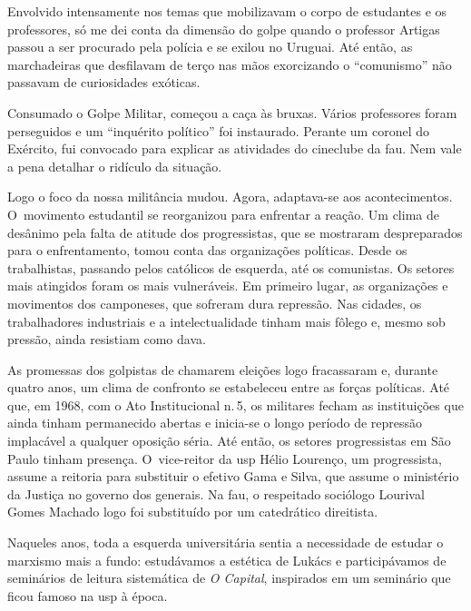 {Envolvido intensamente nos temas que mobilizavam o corpo de estudantes e
os professores, só me dei conta da dimensão do golpe quando o professor
Artigas passou a ser procurado pela polícia e se exilou no Uruguai. Até
então, as marchadeiras que desfilavam de terço nas mãos exorcizando o
“comunismo” não passavam de curiosidades exóticas.

\subject{O golpe}

Consumado o Golpe Militar, começou a caça às bruxas. Vários professores
foram perseguidos e um “inquérito político” foi instaurado. Perante um
coronel do Exército, fui convocado para explicar as atividades do cineclube da {\sc fau}.
Nem vale a pena detalhar o ridículo da situação.

Logo o foco da nossa militância mudou. Agora, adaptava-se aos
acontecimentos. O~movimento estudantil se reorganizou para enfrentar a
reação. Um clima de desânimo pela falta de atitude dos progressistas, que se
mostraram despreparados para o enfrentamento, tomou conta das
organizações políticas. Desde os trabalhistas, passando pelos católicos
de esquerda, até os comunistas. Os setores mais atingidos foram os mais
vulneráveis. Em primeiro lugar, as organizações e movimentos dos
camponeses, que sofreram dura repressão. Nas cidades, os trabalhadores
industriais e a intelectualidade tinham mais fôlego e, mesmo sob pressão,
ainda resistiam como dava.

As promessas dos golpistas de chamarem eleições logo fracassaram e, durante
quatro anos, um clima de confronto se estabeleceu entre as forças políticas.
Até que, em 1968, com o Ato Institucional n.\,5, os militares fecham as
instituições que ainda tinham permanecido abertas e inicia-se o longo
período de repressão implacável a qualquer oposição séria. Até então, os
setores progressistas em São Paulo tinham presença. O~vice-reitor da {\sc usp}
Hélio Lourenço, um progressista, assume a reitoria para substituir o efetivo
Gama e Silva, que assume o ministério da Justiça no governo dos generais.
Na {\sc fau}, o respeitado sociólogo Lourival Gomes Machado logo foi
substituído por um catedrático direitista.

Naqueles anos, toda a esquerda universitária sentia a necessidade de
estudar o marxismo mais a fundo: estudávamos a estética de Lukács e
participávamos de seminários de leitura sistemática de {\it O Capital},
inspirados em um seminário que ficou famoso na {\sc usp} à época.

}
